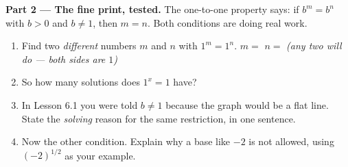 \documentclass[10pt]{article}
\begin{document}
\begin{tcolorbox}[colback=white, colframe=black!40, title=\textbf{Tier E --- Extension},
    fonttitle=\bfseries, arc=1.5mm, left=3mm, right=3mm, top=2mm, bottom=2mm, breakable]
\vspace{6pt}
\textbf{Part 2 --- The fine print, tested.} The one-to-one property says: if $b^{m}=b^{n}$ with $b>0$
and $b\neq1$, then $m=n$. Both conditions are doing real work.
\begin{enumerate}[label=(\alph*), leftmargin=1.9em, itemsep=6pt]
  \item Find two \emph{different} numbers $m$ and $n$ with $1^{m}=1^{n}$. \; $m=$ 
        \quad $n=$  \quad \emph{(any two will do --- both sides are $1$)}
  \item So how many solutions does $1^{x}=1$ have? 
  \item In Lesson 6.1 you were told $b\neq1$ because the graph would be a flat line. State the
        \emph{solving} reason for the same restriction, in one sentence.
  \item Now the other condition. Explain why a base like $-2$ is not allowed, using
        $(-2)^{1/2}$ as your example.
\end{enumerate}


\end{tcolorbox}
\end{document}
